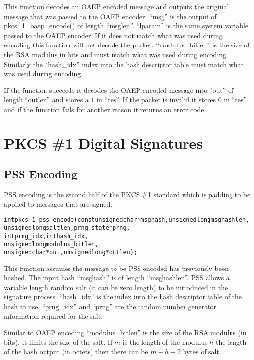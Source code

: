 \documentclass[a4paper]{book}
\begin{document}
This function decodes an OAEP encoded message and outputs the original message that was passed to the OAEP encoder.  ``msg'' is the 
output of pkcs\_1\_oaep\_encode() of length ``msglen''.  ``lparam'' is the same system variable passed to the OAEP encoder.  If it does not
match what was used during encoding this function will not decode the packet.  ``modulus\_bitlen'' is the size of the RSA modulus in bits
and must match what was used during encoding.  Similarly the ``hash\_idx'' index into the hash descriptor table must match what was used
during encoding.

If the function succeeds it decodes the OAEP encoded message into ``out'' of length ``outlen'' and stores a 
$1$ in ``res''.  If the packet is invalid it stores $0$ in ``res'' and if the function fails for another reason
it returns an error code.  

\section{PKCS \#1 Digital Signatures}

\subsection{PSS Encoding}
PSS encoding is the second half of the PKCS \#1 standard which is padding to be applied to messages that are signed.  

\begin{alltt}
int pkcs_1_pss_encode(const unsigned char *msghash, unsigned long msghashlen,
                            unsigned long saltlen,  prng_state   *prng,     
                            int           prng_idx, int           hash_idx,
                            unsigned long modulus_bitlen,
                            unsigned char *out,     unsigned long *outlen);
\end{alltt}

This function assumes the message to be PSS encoded has previously been hashed.  The input hash ``msghash'' is of length 
``msghashlen''.  PSS allows a variable length random salt (it can be zero length) to be introduced in the signature process.  
``hash\_idx'' is the index into the hash descriptor table of the hash to use.  ``prng\_idx'' and ``prng'' are the random
number generator information required for the salt.

Similar to OAEP encoding ``modulus\_bitlen'' is the size of the RSA modulus (in bits).  It limits the size of the salt.  If $m$ is the length
of the modulus $h$ the length of the hash output (in octets) then there can be $m - h - 2$ bytes of salt.  
\end{document}
